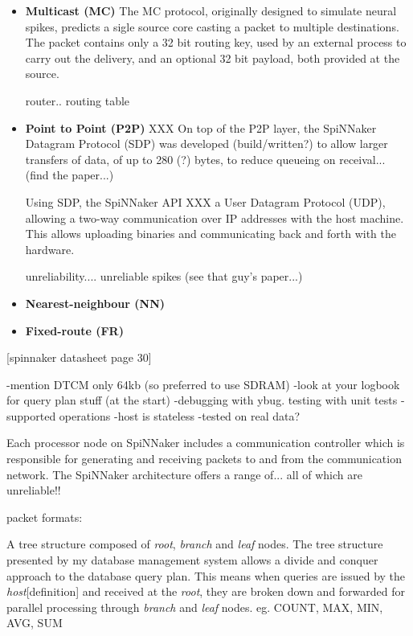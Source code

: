 \begin{itemize}
\item \textbf{Multicast (MC)}
The MC protocol, originally designed to simulate neural spikes, predicts a sigle source core casting a packet to multiple destinations. The packet contains only a 32 bit routing key, used by an external process to carry out the delivery, and an optional 32 bit payload, both provided at the source.

router.. routing table
\item \textbf{Point to Point (P2P)}
XXX
On top of the P2P layer, the SpiNNaker Datagram Protocol (SDP) was developed (build/written?) to allow larger transfers of data, of up to 280 (?) bytes, to reduce queueing on receival... (find the paper...)

Using SDP, the SpiNNaker API XXX a User Datagram Protocol (UDP), allowing a two-way communication over IP addresses with the host machine. This allows uploading binaries and communicating back and forth with the hardware.

unreliability....
unreliable spikes (see that guy's paper...)

\item \textbf{Nearest-neighbour (NN)}
\item \textbf{Fixed-route (FR)}
\end{itemize}

[spinnaker datasheet page 30]

-mention DTCM only 64kb (so preferred to use SDRAM)
-look at your logbook for query plan stuff (at the start)
-debugging with ybug. testing with unit tests
-supported operations
-host is stateless
-tested on real data?

Each processor node on SpiNNaker includes a communication controller which is responsible for generating and receiving packets to and from the communication network.
The SpiNNaker architecture offers a range of...
all of which are unreliable!!

packet formats:


A tree structure composed of \textit{root}, \textit{branch} and \textit{leaf} nodes. The tree structure presented by my database management system allows a divide and conquer approach to the database query plan. This means when queries are issued by the \textit{host}[definition] and received at the \textit{root}, they are broken down and forwarded for parallel processing through \textit{branch} and \textit{leaf} nodes. eg. COUNT, MAX, MIN, AVG, SUM

